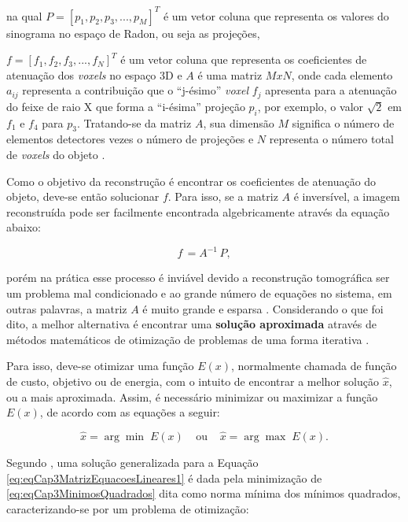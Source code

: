 \noindent na qual $P = [p_{1},p_{2},p_{3},...,p_{M}]^{T}$ é um vetor coluna que representa os valores do sinograma no espaço de Radon, ou seja as projeções, {$f = [f_{1},f_{2},f_{3},...,f_{N}]^{T}$ é um vetor coluna que representa os coeficientes de atenuação dos \textit{voxels} no espaço \acs{3D} e $A$ é uma matriz $MxN$, onde cada elemento $a_{ij}$ representa a contribuição que o ``j-ésimo'' \textit{voxel} $f_{j}$ apresenta para a atenuação do feixe de raio X que forma a ``i-ésima'' projeção $p_{i}$, por exemplo, o valor $\sqrt{2}$ em $f_{1}$ e $f_{4}$ para $p_{3}$. Tratando-se da matriz $A$, sua dimensão $M$ significa o número de elementos detectores vezes o número de projeções e $N$ representa o número total de \textit{voxels} do objeto \cite{zeng2010medical,levakhina2014three}.

Como o objetivo da reconstrução é encontrar os coeficientes de atenuação do objeto, deve-se então solucionar $f$. Para isso, se a matriz $A$ é inversível, a imagem reconstruída pode ser facilmente encontrada algebricamente através da equação abaixo:

 \begin{equation}
 f \, = A^{-1} \, P,
 \label{eq:eqCap3MatrizEquacoesLineares2}
 \end{equation}      

\noindent porém na prática esse processo é inviável devido a reconstrução tomográfica ser um problema mal condicionado e ao grande número de equações no sistema, em outras palavras, a matriz $A$ é muito grande e esparsa \cite{levakhina2014three}. Considerando o que foi dito, a melhor alternativa é encontrar uma \textbf{solução aproximada} através de métodos matemáticos de otimização de problemas de uma forma iterativa \cite{buzug2008computed}.  

Para isso, deve-se otimizar uma função $E(x)$, normalmente chamada de função de custo, objetivo ou de energia, com o intuito de encontrar a melhor solução $\hat{x}$, ou a mais aproximada. Assim, é necessário minimizar ou maximizar a função $E(x)$, de acordo com as equações a seguir:
 
\begin{equation}
\hat{x} = \underset{}{\arg\min} \; E(x) \;\;\;\; \text{ou} \;\;\;\; \hat{x} = \underset{}{\arg\max} \; E(x).
\label{eq:eqCap3Minimizacao}
\end{equation} 

Segundo , uma solução generalizada para a Equação \ref{eq:eqCap3MatrizEquacoesLineares1} é dada pela minimização de \eqref{eq:eqCap3MinimosQuadrados} dita como norma mínima dos mínimos quadrados, caracterizando-se por um problema de otimização:

}

